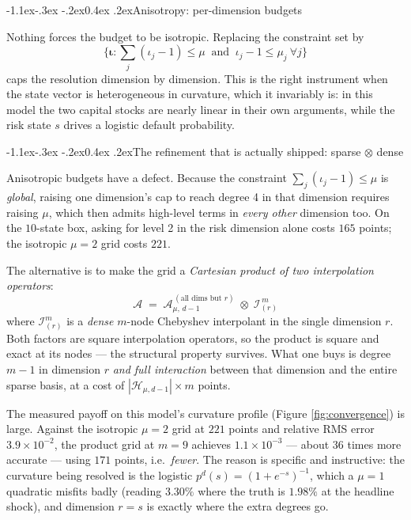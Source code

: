 \documentclass[10pt,a4paper]{article}
\makeatletter
\theoremstyle{definition}
\theoremstyle{plain}
\theoremstyle{remark}
\renewcommand\subsection{\@startsection{subsection}{2}{\z@}%
  {-1.1ex\@plus -.3ex \@minus -.2ex}{0.4ex \@plus .2ex}{\normalfont\normalsize\bfseries}}
\makeatother
\begin{document}
\subsection{Anisotropy: per-dimension budgets}

Nothing forces the budget to be isotropic. Replacing the constraint set by
\begin{equation}
  \Big\{\bm{\iota} : \textstyle\sum_j (\iota_j-1) \le \mu \ \text{ and }\ \iota_j - 1 \le \mu_j\ \forall j\Big\}
\end{equation}
caps the resolution dimension by dimension. This is the right instrument when the state
vector is heterogeneous in curvature, which it invariably is: in this model the two capital
stocks are nearly linear in their own arguments, while the risk state $s$ drives a logistic
default probability.

\subsection{The refinement that is actually shipped: sparse $\otimes$ dense}

Anisotropic budgets have a defect. Because the constraint $\sum_j(\iota_j-1)\le\mu$ is
\emph{global}, raising one dimension's cap to reach degree 4 in that dimension requires
raising $\mu$, which then admits high-level terms in \emph{every other} dimension too. On the
$10$-state box, asking for level 2 in the risk dimension alone costs $165$ points; the
isotropic $\mu=2$ grid costs $221$.

The alternative is to make the grid a \emph{Cartesian product of two interpolation
operators}:
\begin{equation}
  \boxed{\;\mathcal{A} \;=\; \mathcal{A}_{\mu,\,d-1}^{\,(\text{all dims but } r)}
  \;\otimes\; \mathcal{I}^{\,m}_{(r)} \;}
  \label{eq:refine}
\end{equation}
where $\mathcal{I}^{m}_{(r)}$ is a \emph{dense} $m$-node Chebyshev interpolant in the single
dimension $r$. Both factors are square interpolation operators, so the product is square and
exact at its nodes --- the structural property survives. What one buys is degree $m-1$ in
dimension $r$ \emph{and full interaction} between that dimension and the entire sparse basis,
at a cost of $|\mathcal{H}_{\mu,d-1}|\times m$ points.

The measured payoff on this model's curvature profile (Figure \ref{fig:convergence}) is
large. Against the isotropic $\mu=2$ grid at $221$ points and relative RMS error
$3.9\times10^{-2}$, the product grid at $m=9$ achieves $1.1\times10^{-3}$ --- about $36$
times more accurate --- using $171$ points, i.e.\ \emph{fewer}. The reason is specific and
instructive: the curvature being resolved is the logistic $p^d(s) = (1+e^{-s})^{-1}$, which a
$\mu=1$ quadratic misfits badly (reading $3.30\%$ where the truth is $1.98\%$ at the headline
shock), and dimension $r=s$ is exactly where the extra degrees go.
\end{document}
